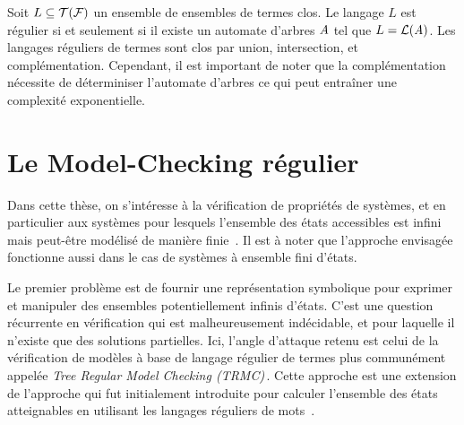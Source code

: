 
Soit $L \subseteq \mathcal{T(F)}$ un ensemble de ensembles de termes clos. Le langage $L$ est régulier si et seulement si il existe
un automate d'arbres $\mathit A$ tel que $L = \mathcal{L}(\mathit A)$. Les langages réguliers de termes sont clos par union, intersection, et 
complémentation. Cependant, il est important de noter que la complémentation nécessite de déterminiser l'automate d'arbres
ce qui peut entraîner une complexité exponentielle.

\section{Le Model-Checking régulier}

Dans cette thèse, on s'intéresse à la vérification de propriétés de systèmes,
et en particulier aux systèmes pour lesquels l'ensemble des états accessibles
est infini mais peut-être modélisé de manière finie~\cite{WB98}. 
Il est à noter que l'approche envisagée fonctionne aussi 
dans le cas de systèmes à ensemble fini d'états.

Le premier problème est de fournir une représentation symbolique 
pour exprimer et manipuler des ensembles potentiellement infinis
d'états. C'est une question récurrente en vérification qui est malheureusement
indécidable, et pour laquelle il n'existe que des solutions partielles.
Ici, l'angle d'attaque retenu est celui de la vérification de modèles
à base de langage régulier de termes plus communément appelée {\em Tree Regular Model Checking
  (TRMC)}\,\cite{ALRd05}. Cette approche est une extension de l'approche qui fut initialement introduite
pour calculer l'ensemble des états atteignables en utilisant les langages réguliers de mots~\cite{BJNT00,BLW03}.


